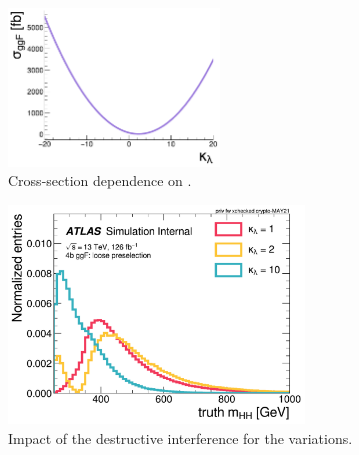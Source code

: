 \begin{figure}
    \centering
    \includegraphics[width=0.5\textwidth]{figures/my_dihiggs/kl_ggF_theory_xsec.pdf}
    \caption{Cross-section dependence on \kl.}
    \label{fig:truth-hh-presel}
\end{figure}

\begin{figure}
    \centering
    \includegraphics[width=0.7\textwidth]{figures/my_dihiggs/truth_mhh_ggf_common_presel.pdf}
    \caption{Impact of the destructive interference for the \kl variations.}
    \label{fig:truth-hh-presel}
\end{figure}
